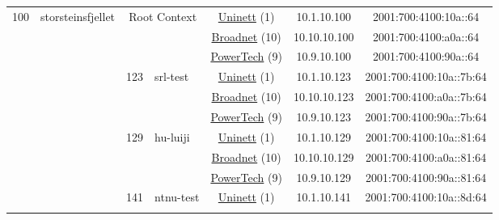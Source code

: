 \begin{small}
\begin{center}
\begin{longtable}{|c|c|c|c|c|c|c|c|}
 \multirow{21}{*}{\tiny{100}} & \multicolumn{1}{|l|}{\multirow{21}{*}{\tiny{storsteinsfjellet}}} & \multicolumn{2}{|c|}{\multirow{3}{*}{\tiny{Root Context}}} & \multicolumn{2}{|c|}{\tiny{\href{https://www.uninett.no}{Uninett} (1)}} & \tiny{10.1.10.100} & \tiny{2001:700:4100:10a::64} \\* \cline{5-5}\cline{6-6}\cline{7-7}\cline{8-8}
  &  & \multicolumn{2}{|c|}{} & \multicolumn{2}{|c|}{\tiny{\href{https://www.broadnet.no}{Broadnet} (10)}} & \tiny{10.10.10.100} & \tiny{2001:700:4100:a0a::64} \\* \cline{5-5}\cline{6-6}\cline{7-7}\cline{8-8}
  &  & \multicolumn{2}{|c|}{} & \multicolumn{2}{|c|}{\tiny{\href{http://www.powertech.no}{PowerTech} (9)}} & \tiny{10.9.10.100} & \tiny{2001:700:4100:90a::64} \\* \cline{3-3}\cline{4-4}\cline{5-5}\cline{6-6}\cline{7-7}\cline{8-8}
  &  & \multirow{3}{*}{\tiny{123}} & \multicolumn{1}{|l|}{\multirow{3}{*}{\tiny{srl-test}}} & \multicolumn{2}{|c|}{\tiny{\href{https://www.uninett.no}{Uninett} (1)}} & \tiny{10.1.10.123} & \tiny{2001:700:4100:10a::7b:64} \\* \cline{5-5}\cline{6-6}\cline{7-7}\cline{8-8}
  &  &  &  & \multicolumn{2}{|c|}{\tiny{\href{https://www.broadnet.no}{Broadnet} (10)}} & \tiny{10.10.10.123} & \tiny{2001:700:4100:a0a::7b:64} \\* \cline{5-5}\cline{6-6}\cline{7-7}\cline{8-8}
  &  &  &  & \multicolumn{2}{|c|}{\tiny{\href{http://www.powertech.no}{PowerTech} (9)}} & \tiny{10.9.10.123} & \tiny{2001:700:4100:90a::7b:64} \\* \cline{3-3}\cline{4-4}\cline{5-5}\cline{6-6}\cline{7-7}\cline{8-8}
  &  & \multirow{3}{*}{\tiny{129}} & \multicolumn{1}{|l|}{\multirow{3}{*}{\tiny{hu-luiji}}} & \multicolumn{2}{|c|}{\tiny{\href{https://www.uninett.no}{Uninett} (1)}} & \tiny{10.1.10.129} & \tiny{2001:700:4100:10a::81:64} \\* \cline{5-5}\cline{6-6}\cline{7-7}\cline{8-8}
  &  &  &  & \multicolumn{2}{|c|}{\tiny{\href{https://www.broadnet.no}{Broadnet} (10)}} & \tiny{10.10.10.129} & \tiny{2001:700:4100:a0a::81:64} \\* \cline{5-5}\cline{6-6}\cline{7-7}\cline{8-8}
  &  &  &  & \multicolumn{2}{|c|}{\tiny{\href{http://www.powertech.no}{PowerTech} (9)}} & \tiny{10.9.10.129} & \tiny{2001:700:4100:90a::81:64} \\* \cline{3-3}\cline{4-4}\cline{5-5}\cline{6-6}\cline{7-7}\cline{8-8}
  &  & \multirow{3}{*}{\tiny{141}} & \multicolumn{1}{|l|}{\multirow{3}{*}{\tiny{ntnu-test}}} & \multicolumn{2}{|c|}{\tiny{\href{https://www.uninett.no}{Uninett} (1)}} & \tiny{10.1.10.141} & \tiny{2001:700:4100:10a::8d:64} \\* \cline{5-5}\cline{6-6}\cline{7-7}\cline{8-8}

\end{longtable}
\end{center}
\end{small}
